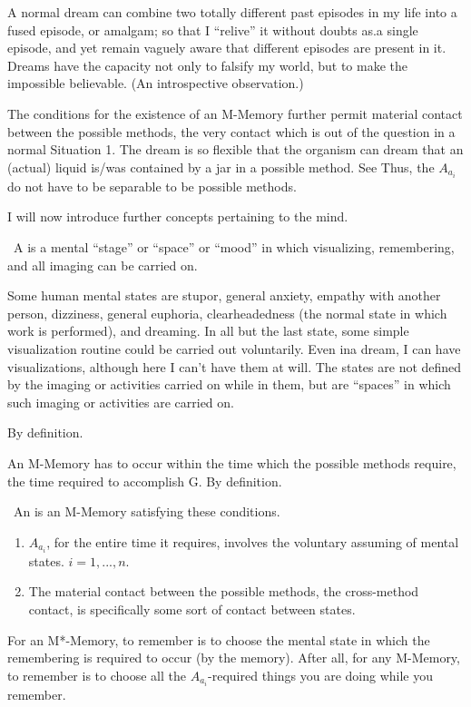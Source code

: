 \begin{hangers}
 A normal dream can combine two totally different 
past episodes in my life into a fused episode, or amalgam; so that I \enquote{relive} it 
without doubts as.a single episode, and yet remain vaguely aware that 
different episodes are present in it. Dreams have the capacity not only to 
falsify my world, but to make the impossible believable. (An introspective 
observation.) 

 The conditions for the existence of an M-Memory 
further permit material contact between the possible methods, the very 
contact which is out of the question in a normal Situation 1. The dream is so 
flexible that the organism can dream that an (actual) liquid is\slash was contained 
by a jar in a possible method. See  Thus, the $A_{a_i}$ do not have 
to be separable to be possible methods. 
\end{hangers}

I will now introduce further concepts pertaining to the mind. 

\begin{hangers}
\ A  is a mental \enquote{stage} or \enquote{space} or \enquote{mood} 
in which visualizing, remembering, and all imaging can be carried on. 
\end{hangers}

Some human mental states are stupor, general anxiety, empathy with 
another person, dizziness, general euphoria, clearheadedness (the normal 
state in which work is performed), and dreaming. In all but the last state, 
some simple visualization routine could be carried out voluntarily. Even ina 
dream, I can have visualizations, although here I can't have them at will. The 
states are not defined by the imaging or activities carried on while in them, 
but are \enquote{spaces} in which such imaging or activities are carried on. 

By definition. 

\begin{hangers}
 An M-Memory has to occur within the time which the 
possible methods require, the time required to accomplish G. By definition. 

\ An  is an M-Memory satisfying these 
conditions. \label{mstardef}
\begin{enumerate}
\item $A_{a_i}$, for the entire time it requires, involves the voluntary 
assuming of mental states. $i=1,...,n$.
\item The material contact between the 
possible methods, the cross-method contact, is specifically some sort of 
contact between states. 
\end{enumerate}

 For an M*-Memory, to remember is to choose the 
mental state in which the remembering is required to occur (by the 
memory). After all, for any M-Memory, to remember is to choose all the 
$A_{a_i}$-required things you are doing while you remember. 
\end{hangers}

